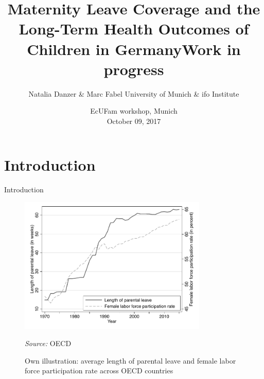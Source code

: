 \documentclass[handout]{beamer} %
\title[Maternity leave and long-run child health]{  \textbf{Maternity Leave Coverage and the Long-Term Health Outcomes of Children in Germany}\newline Work in progress}
\author[Danzer \& Fabel]{Natalia Danzer \& Marc Fabel \newline University of Munich \& ifo Institute}
\date{EcUFam workshop, Munich\\October 09, 2017}
\begin{document}
\begin{frame}
	\titlepage
\end{frame}





\section{Introduction}
\begin{frame}{Introduction}

\begin{figure}\centering
\includegraphics[width=0.8\textwidth]{../../analysis/graphs/SOEP/PL_OECD.pdf}
\caption{Own illustration: average length of parental leave and female labor force participation rate across OECD countries}\vspace{-0.3cm}
\begin{minipage}{\textwidth} %
{\footnotesize \textit{Source: }OECD}
\end{minipage}
\end{figure}

\end{frame}
\end{document}
